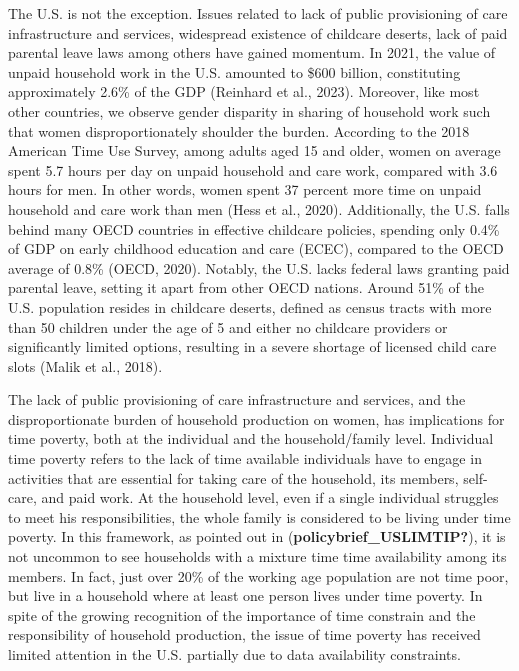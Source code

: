 \documentclass[
  11pt,
]{article}
\begin{document}
The U.S. is not the exception. Issues related to lack of public
provisioning of care infrastructure and services, widespread existence
of childcare deserts, lack of paid parental leave laws among others have
gained momentum. In 2021, the value of unpaid household work in the U.S.
amounted to \$600 billion, constituting approximately 2.6\% of the GDP
(Reinhard et al., 2023). Moreover, like most other countries, we observe
gender disparity in sharing of household work such that women
disproportionately shoulder the burden. According to the 2018 American
Time Use Survey, among adults aged 15 and older, women on average spent
5.7 hours per day on unpaid household and care work, compared with 3.6
hours for men. In other words, women spent 37 percent more time on
unpaid household and care work than men (Hess et al., 2020).
Additionally, the U.S. falls behind many OECD countries in effective
childcare policies, spending only 0.4\% of GDP on early childhood
education and care (ECEC), compared to the OECD average of 0.8\% (OECD,
2020). Notably, the U.S. lacks federal laws granting paid parental
leave, setting it apart from other OECD nations. Around 51\% of the U.S.
population resides in childcare deserts, defined as census tracts with
more than 50 children under the age of 5 and either no childcare
providers or significantly limited options, resulting in a severe
shortage of licensed child care slots (Malik et al., 2018).

The lack of public provisioning of care infrastructure and services, and
the disproportionate burden of household production on women, has
implications for time poverty, both at the individual and the
household/family level. Individual time poverty refers to the lack of
time available individuals have to engage in activities that are
essential for taking care of the household, its members, self-care, and
paid work. At the household level, even if a single individual struggles
to meet his responsibilities, the whole family is considered to be
living under time poverty. In this framework, as pointed out in
(\textbf{policybrief\_USLIMTIP?}), it is not uncommon to see households
with a mixture time time availability among its members. In fact, just
over 20\% of the working age population are not time poor, but live in a
household where at least one person lives under time poverty. In spite
of the growing recognition of the importance of time constrain and the
responsibility of household production, the issue of time poverty has
received limited attention in the U.S. partially due to data
availability constraints.
\end{document}
